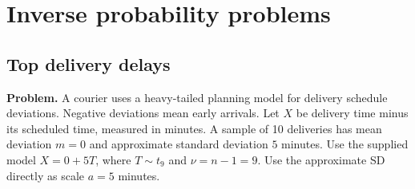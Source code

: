 
\clearpage\section{Inverse probability problems}\label{sec:c8-inverse}

\clearpage
\subsection{Top delivery delays}
\label{c8-i1}
\textbf{Problem.} A courier uses a heavy-tailed planning model for delivery schedule deviations. Negative deviations mean early arrivals. Let $X$ be delivery time minus its scheduled time, measured in minutes. A sample of 10 deliveries has mean deviation $m=0$ and approximate standard deviation $5$ minutes. Use the supplied model $X=0+5T$, where $T\sim t_{9}$ and $\nu=n-1=9$. Use the approximate SD directly as scale $a=5$ minutes.
